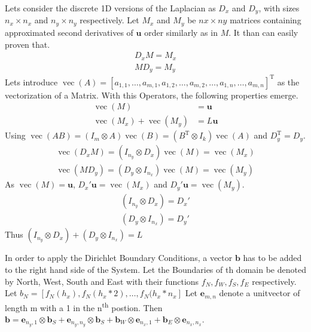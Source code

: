 \documentclass{article}
\begin{document}
Lets consider the discrete 1D versions of the Laplacian as $D_x$ and $D_y$, with sizes $n_x \times n_x$ and $n_y \times n_y$ respectively.
Let $M_x$ and $M_y$ be $nx\times ny$ matrices containing approximated second derivatives of $\mathbf{u}$ order similarly as in $M$. It than can easily proven that.
\begin{align}
    D_x M = M_x \\
    M D_y = M_y
\end{align}
Lets introduce $\operatorname{vec}(A)=\left[a_{1,1}, \ldots, a_{m, 1}, a_{1,2}, \ldots, a_{m, 2}, \ldots, a_{1, n}, \ldots, a_{m, n}\right]^{\mathrm{T}}$ as the vectorization of a Matrix. With this Operators, the following properties emerge.
\begin{align}
    \operatorname{vec}(M) &= \mathbf{u} \\
    \operatorname{vec}(M_x) + \operatorname{vec}(M_y) &= L\mathbf{u}
\end{align}
Using $\operatorname{vec}(A B)=\left(I_{m} \otimes A\right) \operatorname{vec}(B)=\left(B^{\mathrm{T}} \otimes I_{k}\right) \operatorname{vec}(A)$ and $D_y^{\mathrm{T}} = D_y$.
\begin{align}
    \operatorname{vec}(D_x M) = (I_{n_y} \otimes D_x)\operatorname{vec}(M) = \operatorname{vec}(M_x)\\
    \operatorname{vec}(M D_y) = (D_y \otimes I_{n_x})\operatorname{vec}(M) = \operatorname{vec}(M_y)
\end{align} 
As $\operatorname{vec}(M) = \mathbf{u}$, $D_x' \mathbf{u} = \operatorname{vec}(M_x)$ and $D_y' \mathbf{u} = \operatorname{vec}(M_y)$.
\begin{align}
    (I_{n_y} \otimes D_x) = D_x' \\
    (D_y \otimes I_{n_x}) = D_y'
\end{align}
Thus $(I_{n_y} \otimes D_x) + (D_y \otimes I_{n_x}) = L$


In order to apply the Dirichlet Boundary Conditions, a vector $\mathbf{b}$ has to be added to the right hand side of the System. Let the Boundaries of th domain be denoted by North, West, South and East with their functions $f_N, f_W, f_S, f_E$ respectively. Let $b_N = \left[f_N(h_x), f_N(h_x*2), \dots, f_N(h_x*n_x\right]$ %
Let $\mathbf{e}_{m,n}$ denote a unitvector of length m with a 1 in the n\textsuperscript{th} postion.
Then $\mathbf{b} = \mathbf{e}_{n_y,1} \otimes \mathbf{b}_S + \mathbf{e}_{n_y,n_y} \otimes \mathbf{b}_S + \mathbf{b}_W \otimes \mathbf{e}_{n_x,1} + \mathbf{b}_E \otimes \mathbf{e}_{n_x,n_x}$.
\end{document}
